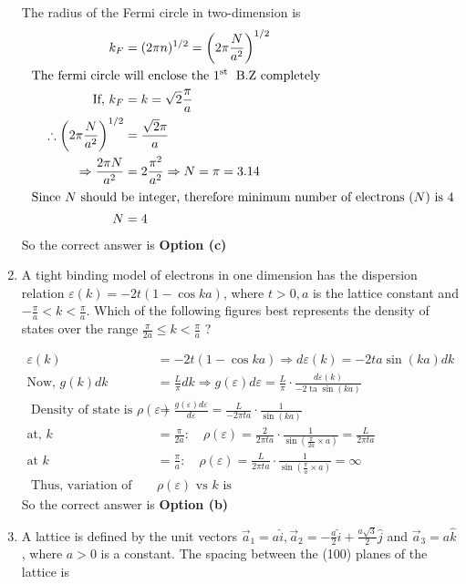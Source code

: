 \begin{enumerate}
\begin{answer}
	The radius of the Fermi circle in two-dimension is
	\begin{align*}
	k_{F}&=(2 \pi n)^{1 / 2}=\left(2 \pi \frac{N}{a^{2}}\right)^{1 / 2}\\
\text{	The fermi circle }&\text{will enclose the $1^{\text {st }}$ B.Z completely}\\
	\text{If, }k_{F}&=k=\sqrt{2} \frac{\pi}{a}\\
	\therefore\left(2 \pi \frac{N}{a^{2}}\right)^{1 / 2}&=\frac{\sqrt{2} \pi}{a} \\
	\Rightarrow \frac{2 \pi N}{a^{2}}&=2 \frac{\pi^{2}}{a^{2}} \Rightarrow N=\pi=3.14\\
\intertext{	Since $N$ should be integer, therefore minimum number of electrons $(N)$ is 4}
	N&=4
	\end{align*}
		So the correct answer is \textbf{Option (c)}
\end{answer}
\item A tight binding model of electrons in one dimension has the dispersion relation $\varepsilon(k)=-2 t(1-\cos k a)$, where $t>0, a$ is the lattice constant and $-\frac{\pi}{a}<k<\frac{\pi}{a}$. Which of the following figures best represents the density of states over the range $\frac{\pi}{2 a} \leq k<\frac{\pi}{a}$ ?
\begin{answer}
	\begin{align*}
	\varepsilon(k)&=-2 t(1-\cos k a) \Rightarrow d \varepsilon(k)=-2 t a \sin (k a) d k\\
	\text{Now, }g(k) d k&=\frac{L}{\pi} d k \Rightarrow g(\varepsilon) d \varepsilon=\frac{L}{\pi} \cdot \frac{d \varepsilon(k)}{-2 \operatorname{ta} \sin (k a)}\\
\text{	Density of state is } \rho(\varepsilon)&=\frac{g(\varepsilon) d \varepsilon}{d \varepsilon}=\frac{L}{-2 \pi t a} \cdot \frac{1}{\sin (k a)}\\
\text{at, }k&=\frac{\pi}{2 a}: \quad \rho(\varepsilon)=\frac{2}{2 \pi t a} \cdot \frac{1}{\sin \left(\frac{\pi}{2 a} \times a\right)}=\frac{L}{2 \pi t a}\\
\text{at }k&=\frac{\pi}{a}: \quad \rho(\varepsilon)=\frac{L}{2 \pi t a} \cdot \frac{1}{\sin \left(\frac{\pi}{a} \times a\right)}=\infty\\
\text { Thus, variation of } &\rho(\varepsilon) \text { vs } k \text { is }
	\end{align*}
		So the correct answer is \textbf{Option (b)}
\end{answer}
\item A lattice is defined by the unit vectors $\vec{a}_{1}=a \hat{i}, \vec{a}_{2}=-\frac{a}{2} \hat{i}+\frac{a \sqrt{3}}{2} \hat{j}$ and $\vec{a}_{3}=a \hat{k}$, where $a>0$ is a constant. The spacing between the (100) planes of the lattice is

\end{enumerate}
